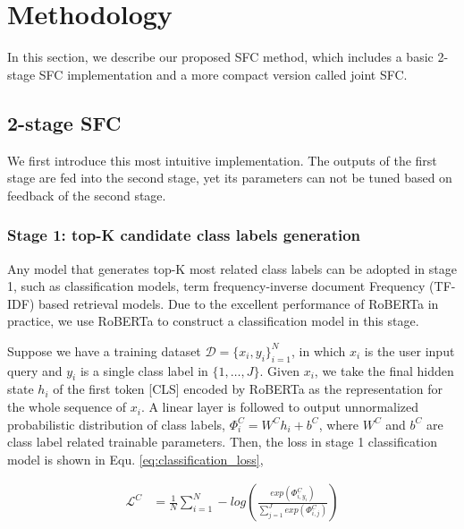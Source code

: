 \section{Methodology}
In this section, we describe our proposed SFC method, which includes a basic 2-stage SFC implementation and a more compact version called joint SFC.

\subsection{2-stage SFC}

We first introduce this most intuitive implementation.
The outputs of the first stage are fed into the second stage, yet its parameters can not be tuned based on feedback of the second stage.

\subsubsection*{Stage 1: top-K candidate class labels generation} 
Any model that generates top-K most related class labels can be adopted in stage 1, such as classification models, term frequency-inverse document Frequency (TF-IDF) based retrieval models.
Due to the excellent performance of RoBERTa in practice, we use RoBERTa to construct a classification model in this stage. 

Suppose we have a training dataset $\mathcal{D}=\{x_{i},y_{i}\}_{i=1}^{N}$, in which $x_{i}$ is the user input query and $y_{i}$ is a single class label in $\{1, \ldots, J\}$. 
Given $x_i$, we take the final hidden state $h_i$ of the first token [CLS] encoded by RoBERTa as the representation for the whole sequence of $x_i$.
A linear layer is followed to output unnormalized probabilistic distribution of class labels, ${\Phi}_i^C=W^C h_i + b^C$, where $W^C$ and $b^C$ are class label related trainable parameters. 
Then, the loss in stage 1 classification model is shown in Equ. \ref{eq:classification_loss},

\vspace{-2em}
\begin{equation}
  \begin{aligned}
    \mathcal{L}^{C}&=\frac{1}{N} \sum_{i=1}^{N}-log(\frac{exp(\varPhi_{i,y_{i}}^C)}{\sum_{j=1}^{J}exp(\varPhi_{i,j}^C)}) \\
    \label{eq:classification_loss}
  \end{aligned}
\end{equation}
\vspace{-2.5em}

